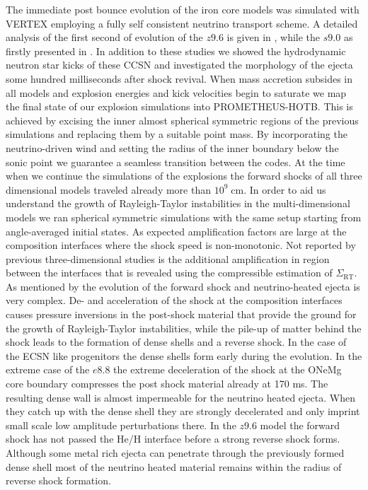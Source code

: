\documentclass[fleqn,usenatbib]{mnras}
\newcommand{\prom}{\textsc{P{\footnotesize ROMETHEUS}-H{\footnotesize OT}B}\xspace}
\newcommand{\vertex}{\textsc{V{\footnotesize ERTEX}}\xspace}
\begin{document}
The immediate post bounce evolution of the iron core models was simulated with \vertex employing a fully self consistent neutrino transport scheme. A detailed analysis of the first second of evolution of the $z9.6$ is given in \citet{Melson2015a}, while the $s9.0$ as firstly presented in \citet{Melson2019}. 
In addition to these studies we showed the hydrodynamic neutron star kicks of these CCSN and investigated the morphology of the ejecta some hundred milliseconds after shock revival. 
When mass accretion subsides in all models and explosion energies and kick velocities begin to saturate we map the final state of our explosion simulations into \prom. This is achieved by excising the inner almost spherical symmetric regions of the previous simulations and replacing them by a suitable point mass. By incorporating the neutrino-driven wind and setting the radius of the inner boundary below the sonic point we guarantee a seamless transition between the codes.
At the time when we continue the simulations of the explosions the forward shocks of all three dimensional models traveled already more than $10^9\;\mathrm{cm}$. 
In order to aid us understand the growth of Rayleigh-Taylor instabilities in the multi-dimensional models we ran spherical symmetric simulations with the same setup starting from angle-averaged initial states. As expected amplification factors are large at the composition interfaces where the shock speed is non-monotonic. Not reported by previous three-dimensional studies is the additional amplification in region between the interfaces that is revealed using the compressible estimation of $\Sigma_{\mathrm{RT}}$.
As mentioned by \citet{Wongwathanarat2015} the evolution of the forward shock and neutrino-heated ejecta is very complex. De- and acceleration of the shock at the composition interfaces causes pressure inversions in the post-shock material that provide the ground for the growth of Rayleigh-Taylor instabilities, while the pile-up of matter behind the shock leads to the formation of dense shells and a reverse shock. 
In the case of the ECSN like progenitors the dense shells form early during the evolution. In the extreme case of the $e8.8$ the extreme deceleration of the shock at the ONeMg core boundary compresses the post shock material already at 170 ms. The resulting dense wall is almost impermeable for the neutrino heated ejecta. When they catch up with the dense shell they are strongly decelerated and only imprint small scale low amplitude perturbations there. 
In the $z9.6$ model the forward shock has not passed the He/H interface before a strong reverse shock forms. Although some metal rich ejecta can penetrate through the previously formed dense shell most of the neutrino heated material remains within the radius of reverse shock formation.
\end{document}
